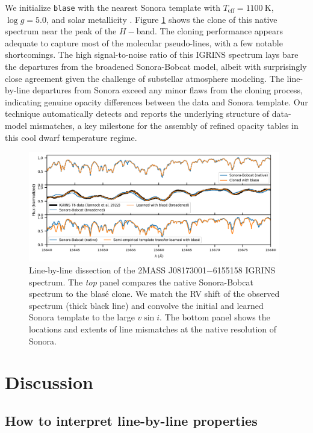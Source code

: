 \documentclass[twocolumn]{aastex631}
\begin{document}
We initialize \texttt{blase} with the nearest Sonora template with $T_\mathrm{eff} = 1100~\text{K}$, $\log{g}=5.0$, and solar metallicity \citep{2022MNRAS.tmp.1421T}.  Figure \ref{fig_IGRINS_sonora_demo} shows the clone of this native spectrum near the peak of the $H-$band. The cloning performance appears adequate to capture most of the molecular pseudo-lines, with a few notable shortcomings. The high signal-to-noise ratio of this IGRINS spectrum lays bare the departures from the broadened Sonora-Bobcat model, albeit with surprisingly close agreement given the challenge of substellar atmosphere modeling.  The line-by-line departures from Sonora exceed any minor flaws from the cloning process, indicating genuine opacity differences between the data and Sonora template.  Our technique automatically detects and reports the underlying structure of data-model mismatches, a key milestone for the assembly of refined opacity tables in this cool dwarf temperature regime.

\begin{figure}[hbt!]
    \centering
    \includegraphics[width=0.98\textwidth]{IGRINS_T6_sonora_demo.png}
    \caption{Line-by-line dissection of the 2MASS J08173001$-$6155158 IGRINS spectrum.  The \emph{top} panel compares the native Sonora-Bobcat spectrum to the blas\'e clone.  We match the RV shift of the observed spectrum (thick black line) and convolve the initial and learned Sonora template to the large $v\sin{i}$.  The bottom panel shows the locations and extents of line mismatches at the native resolution of Sonora.}
    \label{fig_IGRINS_sonora_demo}
\end{figure}


\section{Discussion}\label{secDiscuss}

\subsection{How to interpret line-by-line properties}
\end{document}
